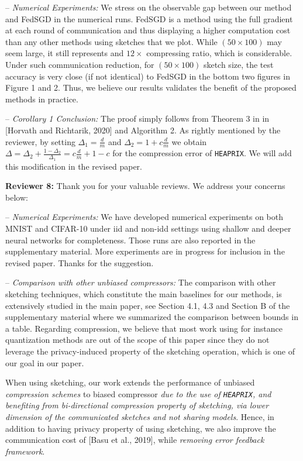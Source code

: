 \documentclass{article}
\begin{document}
-- \textit{Numerical Experiments:} 
We stress on the observable gap between our method and FedSGD in the numerical runs. FedSGD is a method using the full gradient at each round of communication and thus displaying a higher computation cost than any other methods using sketches that we plot.
While $(50 \times 100)$ may seem large, it still represents and $12 \times$ compressing ratio, which is considerable. 
Under such communication reduction, for $(50 \times 100)$ sketch size, the test accuracy is very close (if not identical) to FedSGD in the bottom two figures in Figure 1 and 2. Thus, we believe our results validates the benefit of the proposed methods in practice.


-- \textit{Corollary 1 Conclusion:} 
The proof simply follows from Theorem 3 in in [Horvath and Richtarik, 2020] and Algorithm 2.
As rightly mentioned by the reviewer, by setting $\Delta_1=\frac{d}{m}$ and $\Delta_2=1+c\frac{d}{m}$ we obtain $\Delta=\Delta_2+\frac{1-\Delta_2}{\Delta_1}=c\frac{d}{m} + 1 - c$ for the compression error of \texttt{HEAPRIX}. We will add this modification in the revised paper. 

\textbf{Reviewer 8:} Thank you for your valuable reviews. We address your concerns below:

-- \textit{Numerical Experiments:} We have developed numerical experiments on both MNIST and CIFAR-10 under iid and non-idd settings using shallow and deeper neural networks for completeness. Those runs are also reported in the supplementary material.
More experiments are in progress for inclusion in the revised paper. Thanks for the suggestion.

-- \textit{Comparison with other unbiased compressors:} 
The comparison with other sketching techniques, which constitute the main baselines for our methods, is extensively studied in the main paper, see Section 4.1, 4.3 and Section B of the supplementary material where we summarized the comparison between bounds in a table.
Regarding compression, we believe that most work using for instance quantization methods are out of the scope of this paper since they do not leverage the privacy-induced property of the sketching operation, which is one of our goal in our paper.

When using sketching, our work extends the performance of unbiased \emph{compression schemes} to biased compressor \emph{due to the use of \texttt{HEAPRIX}, and benefiting from bi-directional compression property of sketching, via lower dimension of the communicated sketches and not sharing models}.  
Hence, in addition to having privacy property of using sketching, we also improve the communication cost of [Basu et al., 2019], while \emph{removing error feedback framework}.   
\end{document}
